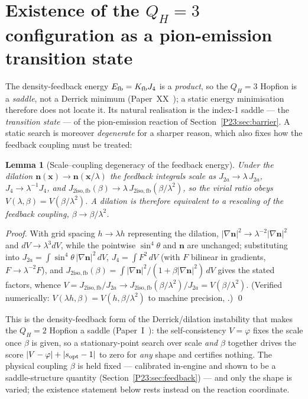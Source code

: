 \documentclass[11pt,a4paper]{article}
\newtheorem{lemma}[theorem]{Lemma}
\theoremstyle{definition}\newtheorem{definition}[theorem]{Definition}
\newcommand{\vp}{\varphi}
\newcommand{\QH}{Q_H}
\begin{document}
\section{Existence of the $\QH=3$ configuration as a pion-emission transition state}
\label{P23:sec:existence}
The density-feedback energy $E_{\rm fb}=K_{\rm fb}J_4$ is a \emph{product}, so the $\QH=3$ Hopfion
is a \emph{saddle}, not a Derrick minimum (Paper~XX~\cite{Paper20}); a static energy
minimisation therefore does not locate it. Its natural realisation is the index-1 saddle --- the
\emph{transition state} --- of the pion-emission reaction of Section~\ref{P23:sec:barrier}. A
static search is moreover \emph{degenerate} for a sharper reason, which also fixes how the feedback
coupling must be treated:

\begin{lemma}[Scale--coupling degeneracy of the feedback energy]
\label{P23:lem:scaling}
Under the dilation $\mathbf{n}(\mathbf{x})\to\mathbf{n}(\mathbf{x}/\lambda)$ the feedback integrals
scale as $J_{2a}\to\lambda\,J_{2a}$, $J_4\to\lambda^{-1}J_4$, and
$J_{2\mathrm{iso,fb}}(\beta)\to\lambda\,J_{2\mathrm{iso,fb}}(\beta/\lambda^2)$, so the virial ratio
obeys $V(\lambda,\beta)=V(\beta/\lambda^2)$. A dilation is therefore equivalent to a rescaling of
the feedback coupling, $\beta\to\beta/\lambda^2$.
\end{lemma}

\begin{proof}
With grid spacing $h\to\lambda h$ representing the dilation, $|\nabla\mathbf{n}|^2\to\lambda^{-2}
|\nabla\mathbf{n}|^2$ and $dV\to\lambda^3 dV$, while the pointwise $\sin^4\!\theta$ and
$\mathbf{n}$ are unchanged; substituting into $J_{2a}=\int\sin^4\!\theta\,|\nabla\mathbf{n}|^2\,dV$,
$J_4=\int F^2\,dV$ (with $F$ bilinear in gradients, $F\to\lambda^{-2}F$), and
$J_{2\mathrm{iso,fb}}(\beta)=\int|\nabla\mathbf{n}|^2/(1+\beta|\nabla\mathbf{n}|^2)\,dV$ gives the
stated factors, whence $V=J_{2\mathrm{iso,fb}}/J_{2a}\to J_{2\mathrm{iso,fb}}(\beta/\lambda^2)/
J_{2a}=V(\beta/\lambda^2)$. (Verified numerically: $V(\lambda h,\beta)=V(h,\beta/\lambda^2)$ to
machine precision, .) \qed
\end{proof}

\noindent This is the density-feedback form of the Derrick/dilation instability that makes the
$\QH=2$ Hopfion a saddle (Paper~I~\cite{Paper1}): the self-consistency $V=\vp$ fixes the scale once $\beta$ is
given, so a stationary-point search over scale \emph{and} $\beta$ together drives the score
$|V-\vp|+|s_{\rm opt}-1|$ to zero for \emph{any} shape and certifies nothing. The physical coupling
$\beta$ is held fixed --- calibrated in-engine and shown to be a saddle-structure quantity
(Section~\ref{P23:sec:feedback}) --- and only the shape is varied; the existence statement below
rests instead on the reaction coordinate.
\end{document}
